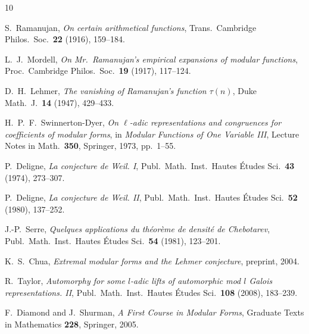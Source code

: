 \documentclass[12pt,a4paper]{amsart}
\theoremstyle{definition}
\begin{document}
\begin{thebibliography}{10}

S.~Ramanujan,
\textit{On certain arithmetical functions},
Trans.\ Cambridge Philos.\ Soc.\ \textbf{22} (1916), 159--184.

L.~J.~Mordell,
\textit{On Mr.\ Ramanujan's empirical expansions of modular functions},
Proc.\ Cambridge Philos.\ Soc.\ \textbf{19} (1917), 117--124.

D.~H.~Lehmer,
\textit{The vanishing of Ramanujan's function $\tau(n)$},
Duke Math.\ J.\ \textbf{14} (1947), 429--433.

H.~P.~F.~Swinnerton-Dyer,
\textit{On $\ell$-adic representations and congruences for coefficients of modular
forms},
in \textit{Modular Functions of One Variable III}, Lecture Notes in Math.\ \textbf{350},
Springer, 1973, pp.\ 1--55.

P.~Deligne,
\textit{La conjecture de Weil. I},
Publ.\ Math.\ Inst.\ Hautes \'Etudes Sci.\ \textbf{43} (1974), 273--307.

P.~Deligne,
\textit{La conjecture de Weil. II},
Publ.\ Math.\ Inst.\ Hautes \'Etudes Sci.\ \textbf{52} (1980), 137--252.

J.-P.~Serre,
\textit{Quelques applications du th\'eor\`eme de densit\'e de Chebotarev},
Publ.\ Math.\ Inst.\ Hautes \'Etudes Sci.\ \textbf{54} (1981), 123--201.

K.~S.~Chua,
\textit{Extremal modular forms and the Lehmer conjecture},
preprint, 2004.

R.~Taylor,
\textit{Automorphy for some $l$-adic lifts of automorphic mod $l$ Galois
representations. II},
Publ.\ Math.\ Inst.\ Hautes \'Etudes Sci.\ \textbf{108} (2008), 183--239.

F.~Diamond and J.~Shurman,
\textit{A First Course in Modular Forms},
Graduate Texts in Mathematics \textbf{228}, Springer, 2005.

\end{thebibliography}
\end{document}
